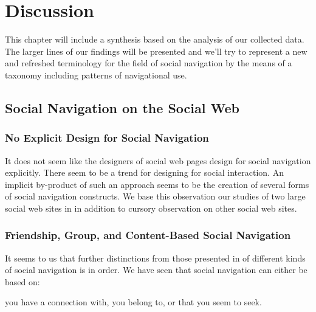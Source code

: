 \chapter{Discussion}
\label{chapter:discussion}

This chapter will include a synthesis based on the analysis of our collected
data. The larger lines of our findings will be presented and we'll try to
represent a new and refreshed terminology for the field of social navigation
by the means of a taxonomy including patterns of navigational use.

\section{Social Navigation on the Social Web}

\subsection{No Explicit Design for Social Navigation}

It does not seem like the designers of social web pages design for social
navigation explicitly. There seem to be a trend for designing for social
interaction. An implicit by-product of such an approach seems to be
the creation of several forms of social navigation constructs.
We base this observation our studies of two large social web sites in
 in addition to cursory observation on other social web
sites.

\subsection{Friendship, Group, and Content-Based Social Navigation}


It seems to us that further distinctions from those presented in
of different kinds of social navigation is in order. We have seen that social
navigation can either be based on:

\begin{items}
   you have a connection with,
   you belong to, or
   that you seem to seek.
\end{items}


